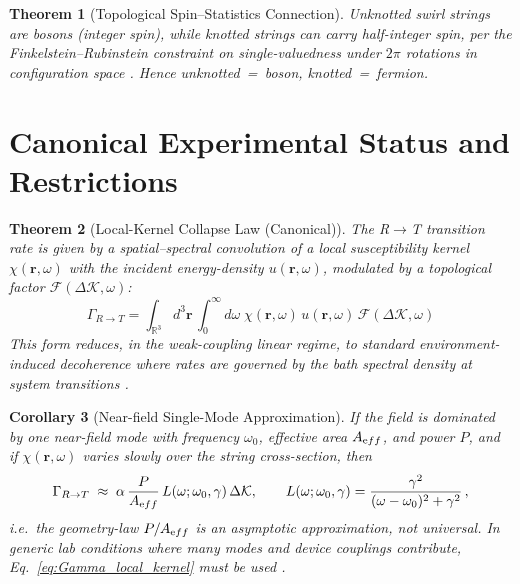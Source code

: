 \documentclass[11pt]{article}
\newtheorem{theorem}{Theorem}[section]
\newtheorem{corollary}[theorem]{Corollary}
\begin{document}
	\begin{theorem}[Topological Spin--Statistics Connection]
		Unknotted swirl strings are bosons (integer spin), while knotted strings can carry half-integer spin, per the Finkelstein--Rubinstein constraint on single-valuedness under $2\pi$ rotations in configuration space \cite{FinkelsteinRubinstein1968}. Hence unknotted~=~boson, knotted~=~fermion.
	\end{theorem}

	\section{Canonical Experimental Status and Restrictions}
	\label{sec:exp_status_patch}

	\begin{theorem}[Local-Kernel Collapse Law (Canonical)]
		\label{thm:local_kernel}
		The R$\to$T transition rate is given by a spatial–spectral convolution of a local susceptibility kernel $\chi(\mathbf r,\omega)$ with the incident energy-density $u(\mathbf r,\omega)$, modulated by a topological factor $\mathcal F(\Delta\mathcal K,\omega)$:
		\begin{equation}
			\boxed{\;
			\Gamma_{R\to T}
				=
				\int_{\mathbb{R}^3}\!\! d^3\mathbf r\,
				\int_0^\infty\!\! d\omega\;
				\chi(\mathbf r,\omega)\,
				u(\mathbf r,\omega)\,
				\mathcal F(\Delta\mathcal K,\omega)
				\;}
			\label{eq:Gamma_local_kernel}
		\end{equation}
		This form reduces, in the weak-coupling linear regime, to standard environment-induced decoherence where rates are governed by the bath spectral density at system transitions \cite{Zurek2003,Hornberger2012RMP}.
	\end{theorem}

	\begin{corollary}[Near-field Single-Mode Approximation]
		\label{cor:P_over_A}
		If the field is dominated by one near-field mode with frequency $\omega_0$, effective area $A_{\textrm eff}$, and power $P$, and if $\chi(\mathbf r,\omega)$ varies slowly over the string cross-section, then
		\begin{equation}
			\Gamma_{R\to T}\;\approx\;
			\alpha\,\frac{P}{A_{\textrm eff}}\,
			L(\omega;\omega_0,\gamma)\,\Delta\mathcal K,
			\qquad
			L(\omega;\omega_0,\gamma)=\frac{\gamma^2}{(\omega-\omega_0)^2+\gamma^2}\,,
			\label{eq:P_over_A}
		\end{equation}
		i.e.\ the geometry-law \(P/A_{\textrm eff}\) is an \emph{asymptotic} approximation, not universal. In generic lab conditions where many modes and device couplings contribute, Eq.~\eqref{eq:Gamma_local_kernel} must be used \cite{Hornberger2012RMP,Krantz2019APR}.
	\end{corollary}
\end{document}
